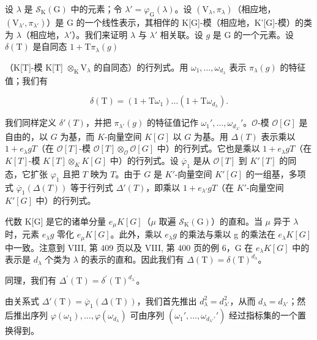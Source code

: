 设 \(\lambda\) 是 \(\mathcal{S}_{\mathrm{K}}(\mathrm{G})\) 中的元素；令 \(\lambda' = \varphi_{\mathrm{G}}(\lambda)\)。设 \((\mathrm{V}_{\lambda}, \pi_{\lambda})\)（相应地，\((\mathrm{V}_{\lambda'}, \pi_{\lambda'})\)）是 G 的一个线性表示，其相伴的 K{[}G{]}-模（相应地，K'{[}G{]}-模）的类为 \(\lambda\)（相应地，\(\lambda'\)）。我们来证明 \(\lambda\) 与 \(\lambda'\) 相关联。设 \(g\) 是 G 的一个元素。设 \(\delta(\mathrm{T})\) 是自同态 \(1 + \mathrm{T}\pi_{\lambda}(g)\)

（K{[}T{]}-模 K{[}T{]} \(\otimes_{\mathrm{K}}\mathrm{V}_{\lambda}\) 的自同态）的行列式。用 \(\omega_{1},\ldots ,\omega_{d_{\lambda}}\) 表示 \(\pi_{\lambda}(g)\) 的特征值；我们有

\[
\delta (\mathrm{T}) = (1 + \mathrm{T} \omega_ {1}) \dots (1 + \mathrm{T} \omega_ {d _ {\lambda}}).
\]

我们同样定义 \(\delta'(T)\)，并把 \(\pi_{\lambda'}(g)\) 的特征值记作 \(\omega_1', \ldots, \omega_{d_{\lambda'}}'\)。\(\mathcal{O}\)-模 \(\mathcal{O}[G]\) 是自由的，以 \(G\) 为基，而 \(K\)-向量空间 \(K[G]\) 以 \(G\) 为基。用 \(\Delta(T)\) 表示乘以 \(1 + e_{\lambda}gT\)（在 \(\mathcal{O}[T]\)-模 \(\mathcal{O}[T] \otimes_{\mathcal{O}} \mathcal{O}[G]\) 中）的行列式。它也是乘以 \(1 + e_{\lambda}gT\)（在 \(K[T]\)-模 \(K[T] \otimes_K K[G]\) 中）的行列式。设 \(\overline{\varphi}_1\) 是从 \(\mathcal{O}[T]\) 到 \(K'[T]\) 的同态，它扩张 \(\varphi_1\) 且把 \(T\) 映为 \(T\)。由于 \(G\) 是 \(K'\)-向量空间 \(K'[G]\) 的一组基，多项式 \(\overline{\varphi}_1(\Delta(T))\) 等于行列式 \(\Delta'(T)\)，即乘以 \(1 + e_{\lambda'}gT\)（在 \(K'\)-向量空间 \(K'[G]\) 中）的行列式。

代数 K{[}G{]} 是它的诸单分量 \(e_{\mu}K[G]\)（\(\mu\) 取遍 \(\mathcal{S}_{\mathrm{K}}(\mathrm{G})\)）的直和。当 \(\mu\) 异于 \(\lambda\) 时，元素 \(e_{\lambda}g\) 零化 \(e_{\mu}K[G]\)。此外，乘以 \(e_{\lambda}g\) 的乘法与乘以 g 的乘法在 \(e_{\lambda}K[G]\) 中一致。注意到 VIII, 第 409 页以及 VIII, 第 400 页的例 6，G 在 \(e_{\lambda}K[G]\) 中的表示是 \(d_{\lambda}\) 个类为 \(\lambda\) 的表示的直和。因此我们有 \(\Delta(\mathrm{T}) = \delta(\mathrm{T})^{d_{\lambda}}\)。

同理，我们有 \(\Delta^{\prime}(\mathrm{T}) = \delta^{\prime}(\mathrm{T})^{d_{\lambda^{\prime}}}\)。

由关系式 \(\Delta'(\mathrm{T}) = \overline{\varphi}_1(\Delta(\mathrm{T}))\)，我们首先推出 \(d_{\lambda}^2 = d_{\lambda'}^2\)，从而 \(d_{\lambda} = d_{\lambda'}\)；然后推出序列 \(\varphi(\omega_1), \ldots, \varphi(\omega_{d_\lambda})\) 可由序列 \((\omega_1', \ldots, \omega_{d_{\lambda'}'}')\) 经过指标集的一个置换得到。

